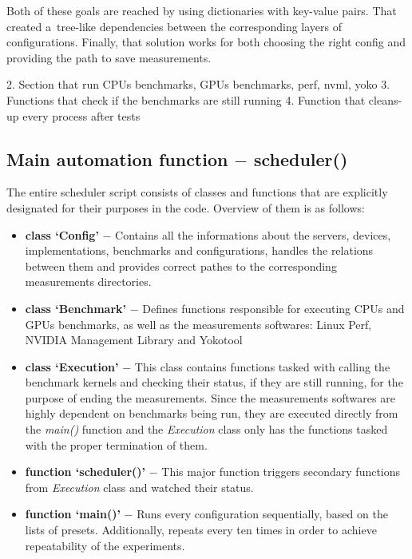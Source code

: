 Both of these goals are reached by using dictionaries with key-value pairs.
That created a~tree-like dependencies between the corresponding layers of
configurations. Finally, that solution works for both choosing the right
config and providing the path to save measurements.


2. Section that run CPUs benchmarks, GPUs benchmarks, perf, nvml, yoko
3. Functions that check if the benchmarks are still running
4. Function that cleans-up every process after tests

\newpage

\subsection{Main automation function $-$ scheduler()}


The entire scheduler script consists of classes and functions that are
explicitly designated for their purposes in the code. Overview of them is
as follows:

\begin{itemize}
    \item \textbf{class `Config'} $-$ Contains all the informations about the servers,
    devices, implementations, benchmarks and configurations, handles the
    relations between them and provides correct pathes to the corresponding
    measurements directories.
    \item \textbf{class `Benchmark'} $-$ Defines functions responsible for
    executing CPUs and GPUs benchmarks, as well as the measurements
    softwares: Linux Perf, NVIDIA Management Library and Yokotool
    \item \textbf{class `Execution'} $-$ This class contains functions tasked with
    calling the benchmark kernels and checking their status, if they are still
    running, for the purpose of ending the measurements. Since the
    measurements softwares are highly dependent on benchmarks being run, they
    are executed directly from the \emph{main\@()} function and
    the \emph{Execution} class only has the functions tasked with the proper
    termination of them.
    \item \textbf{function `scheduler\@()'} $-$ This major function triggers
    secondary functions from \emph{Execution} class and watched their status.
    \item \textbf{function `main\@()'} $-$ Runs every configuration
    sequentially, based on the lists of presets. Additionally, repeats every
    ten times in order to achieve repeatability of the experiments.
\end{itemize}

